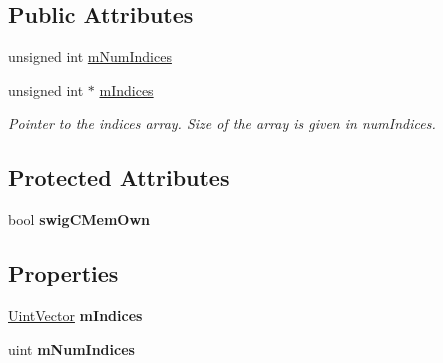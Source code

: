 \subsection*{Public Attributes}
\begin{DoxyCompactItemize}
\item 
unsigned int \hyperlink{structai_face_adda2698cec0ebfe651572f4a5701360b}{m\+Num\+Indices}
\item 
\hypertarget{structai_face_a2026b434c40cf1636f9f464a592ec36c}{unsigned int $\ast$ \hyperlink{structai_face_a2026b434c40cf1636f9f464a592ec36c}{m\+Indices}}\label{structai_face_a2026b434c40cf1636f9f464a592ec36c}

\begin{DoxyCompactList}\small\item\em Pointer to the indices array. Size of the array is given in num\+Indices. \end{DoxyCompactList}\end{DoxyCompactItemize}
\subsection*{Protected Attributes}
\begin{DoxyCompactItemize}
\item 
\hypertarget{structai_face_a95fed843e694ef716ea9d58ac6b99e43}{bool {\bfseries swig\+C\+Mem\+Own}}\label{structai_face_a95fed843e694ef716ea9d58ac6b99e43}

\end{DoxyCompactItemize}
\subsection*{Properties}
\begin{DoxyCompactItemize}
\item 
\hypertarget{structai_face_a1bf37c95db9fb654625fcb9606721f4a}{\hyperlink{class_uint_vector}{Uint\+Vector} {\bfseries m\+Indices}}\label{structai_face_a1bf37c95db9fb654625fcb9606721f4a}

\item 
\hypertarget{structai_face_af5803327b99697d8a471d4a8bef12430}{uint {\bfseries m\+Num\+Indices}}\label{structai_face_af5803327b99697d8a471d4a8bef12430}

\end{DoxyCompactItemize}


